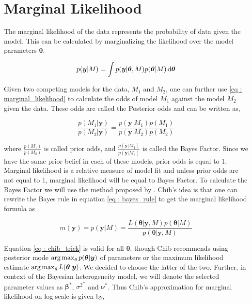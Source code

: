 \section{Marginal Likelihood}
\label{sec : marginal_likelihood}

The marginal likelihood of the data represents the probability of data given the model. This can be calculated by marginalizing the likelihood over the model parameters $\boldsymbol{\theta}$. 

\begin{equation}
\label{eq : marginal_likelihood}
p(\boldsymbol{y}|M) = \int p(\boldsymbol{y}|\boldsymbol{\theta}, M) p(\boldsymbol{\theta}|M) \mathop{}\!\mathrm{d} \boldsymbol{\theta}
\end{equation}

Given two competing models for the data, $M_1$ and $M_2$, one can further use \ref{eq : marginal_likelihood} to calculate the odds of model $M_1$ against the model $M_2$ given the data. These odds are called the Posterior odds and can be written as,

$$\frac {p(M_1|\boldsymbol{y})}{p(M_2|\boldsymbol{y})} = \frac {p(\boldsymbol{y}|M_1) p(M_1)} {p(\boldsymbol{y}|M_2) p(M_2)}$$

where $\frac {p(M_1)}{p(M_2)}$ is called prior odds, and $\frac {p(\boldsymbol{y}|M_1)} {p(\boldsymbol{y}|M_2)}$ is called the Bayes Factor. Since we have the same prior belief in each of these models, prior odds is equal to 1. Marginal likelihood is a relative measure of model fit and unless prior odds are not equal to 1, marginal likelihood will be equal to Bayes Factor. To calculate the Bayes Factor we will use the method proposed by \citet{chib_marginal_1995}. Chib's idea is that one can rewrite the Bayes rule in equation \ref{eq : bayes_rule} to get the marginal likelihood formula as

\begin{equation}
\label{eq : chib_trick}
m(\boldsymbol{y}) = p(\boldsymbol{y}|M) = \dfrac {L(\boldsymbol{\theta}|\boldsymbol{y}, M) p(\boldsymbol{\theta}|M)} {p(\boldsymbol{\theta}|\boldsymbol{y}, M)}
\end{equation}

Equation \ref{eq : chib_trick} is valid for all $\boldsymbol{\theta}$, though Chib recommends using posterior mode $\operatorname*{arg\,max}_\theta p(\boldsymbol{\theta}|\boldsymbol{y})$ of parameters or the maximum likelihood estimate $\operatorname*{arg\,max}_\theta L(\boldsymbol{\theta}|\boldsymbol{y})$. We decided to choose the latter of the two. Further, in context of the Bayesian heterogeneity model, we will denote the selected parameter values as ${\boldsymbol{\beta}}^*$, ${\sigma^2}^*$ and $\boldsymbol{\nu}^*$. Thus Chib's approximation for marginal likelihood on log scale is given by,

